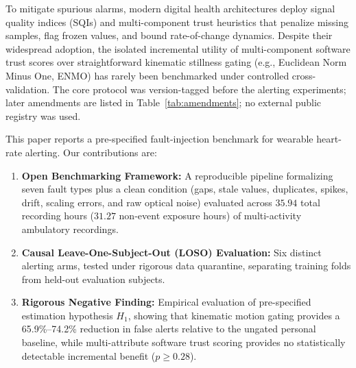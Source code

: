 \documentclass[conference]{IEEEtran}
\begin{document}
To mitigate spurious alarms, modern digital health architectures deploy signal quality indices (SQIs) and multi-component trust heuristics that penalize missing samples, flag frozen values, and bound rate-of-change dynamics. Despite their widespread adoption, the isolated incremental utility of multi-component software trust scores over straightforward kinematic stillness gating (e.g., Euclidean Norm Minus One, ENMO) has rarely been benchmarked under controlled cross-validation. The core protocol was version-tagged before the alerting experiments; later amendments are listed in Table~\ref{tab:amendments}; no external public registry was used.

This paper reports a pre-specified fault-injection benchmark for wearable heart-rate alerting. Our contributions are:
\begin{enumerate}
    \item \textbf{Open Benchmarking Framework:} A reproducible pipeline formalizing seven fault types plus a clean condition (gaps, stale values, duplicates, spikes, drift, scaling errors, and raw optical noise) evaluated across $35.94$ total recording hours ($31.27$ non-event exposure hours) of multi-activity ambulatory recordings.
    \item \textbf{Causal Leave-One-Subject-Out (LOSO) Evaluation:} Six distinct alerting arms, tested under rigorous data quarantine, separating training folds from held-out evaluation subjects.
    \item \textbf{Rigorous Negative Finding:} Empirical evaluation of pre-specified estimation hypothesis $H_1$, showing that kinematic motion gating provides a 65.9\%--74.2\% reduction in false alerts relative to the ungated personal baseline, while multi-attribute software trust scoring provides no statistically detectable incremental benefit ($p \ge 0.28$).
\end{enumerate}
\end{document}

